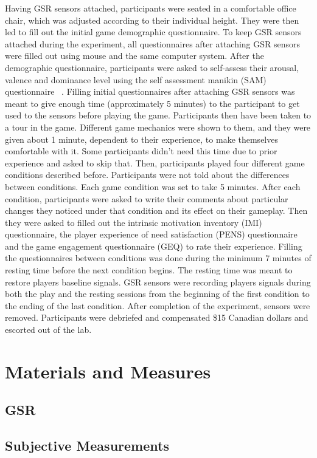 Having GSR sensors attached, participants were seated in a comfortable office chair, which was adjusted according to their individual height. They were then led to fill out the initial game demographic questionnaire. To keep GSR sensors attached during the experiment, all questionnaires after attaching GSR sensors were filled out using mouse and the same computer system. After the demographic questionnaire, participants were asked to self-assess their arousal, valence and dominance level using the self assessment manikin (SAM) questionnaire ~\cite{?}. Filling initial questionnaires after attaching GSR sensors was meant to give enough time (approximately 5 minutes) to the participant to get used to the sensors before playing the game. Participants then have been taken to a tour in the game. Different game mechanics were shown to them, and they were given about 1 minute, dependent to their experience, to make themselves comfortable with it. Some participants didn't need this time due to prior experience and asked to skip that. Then, participants played four different game conditions described before. Participants were not told about the differences between conditions. Each game condition was set to take 5 minutes. After each condition, participants were asked to write their comments about particular changes they noticed under that condition and its effect on their gameplay. Then they were asked to filled out the intrinsic motivation inventory (IMI) questionnaire, the player experience of need satisfaction (PENS) questionnaire and the game engagement questionnaire (GEQ) to rate their experience. Filling the questionnaires between conditions was done during the minimum 7 minutes of resting time before the next condition begins. The resting time was meant to restore players baseline signals. GSR sensors were recording players signals during both the play and the resting sessions from the beginning of the first condition to the ending of the last condition. After completion of the experiment, sensors were removed. Participants were debriefed and compensated \$15 Canadian dollars and escorted out of the lab.

\section{Materials and Measures}
\subsection{GSR}

\subsection{Subjective Measurements}

